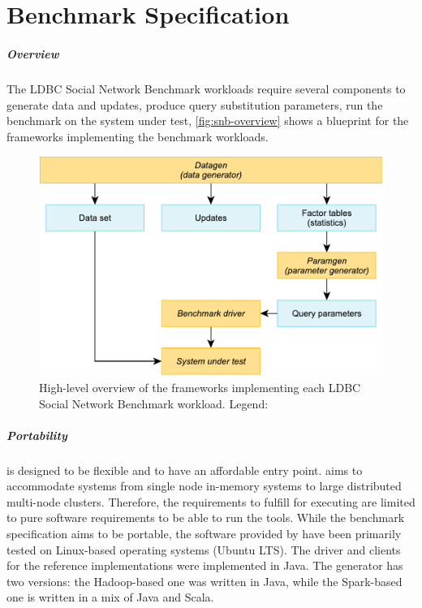 \chapter{Benchmark Specification}
\label{sec:benchmark-specification}

\paragraph{Overview}
The LDBC Social Network Benchmark workloads require several components to generate data and updates, produce query substitution parameters, run the benchmark on the system under test, \etc
\autoref{fig:snb-overview} shows a blueprint for the frameworks implementing the \ldbcsnb benchmark workloads.

\begin{figure}[htbp]
    \centering
    \includegraphics[scale=\yedscale]{figures/snb-overview}
    \caption{
        High-level overview of the frameworks implementing each LDBC Social Network Benchmark workload.
        Legend:
    }
    \label{fig:snb-overview}
\end{figure}

\paragraph*{Portability}
\ldbcsnb is designed to be flexible and to have an affordable entry point. \ldbcsnb aims to accommodate systems from single node in-memory systems to large distributed multi-node clusters. Therefore, the requirements to fulfill for executing \ldbcsnb are limited to pure software requirements to be able to run the tools.
While the benchmark specification aims to be portable, the software provided by \ldbcsnb have been primarily tested on Linux-based operating systems (\eg Ubuntu LTS). The driver and clients for the reference implementations were implemented in Java. The generator has two versions: the Hadoop-based one was written in Java, while the Spark-based one is written in a mix of Java and Scala. 

